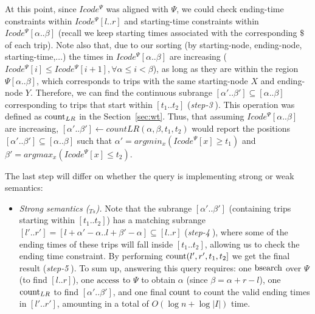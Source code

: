 \begin{itemize}
		At this point, since $Icode^{\Psi}$  was aligned with $\Psi$, 
		we could check ending-time constraints within $Icode^{\Psi}[l..r]$  and starting-time constraints 
		within $Icode^{\Psi}[\alpha..\beta]$ (recall we keep starting times associated with the corresponding $\$$ of each trip).
		Note also that, due to our sorting (by starting-node, ending-node, starting-time,$\dots$) the times in $Icode^{\Psi}[\alpha..\beta]$ are 
		increasing ($Icode^{\Psi}[i] \leq Icode^{\Psi}[i+1], \forall \alpha \leq i < \beta$), as long as they are within the region $\Psi[\alpha..\beta]$, which corresponds to trips with the same starting-node $X$ and ending-node $Y$.
		Therefore, we can find the continuous subrange $[\alpha'..\beta'] \subseteq [\alpha..\beta] $ corresponding to trips
		that start within $[t_1..t_2]$ ({\em step-\textcircled{3}}).
		This operation was defined as $\operatorname{count}_{LR}$ in the Section~\ref{sec:wt}.
		Thus, that assuming $Icode^{\Psi}[\alpha..\beta]$ are increasing,  
		$[\alpha'..\beta'] \leftarrow countLR(\alpha,\beta,t_1,t_2)$ would report the 
		positions $[\alpha'..\beta'] \subseteq [\alpha..\beta]$ such that $\alpha' = argmin_{x} (Icode^{\Psi}[x] \geq t_1)$ and
		$\beta' = argmax_{x} (Icode^{\Psi}[x] \leq t_2)$.
		
		
		The last step will differ on whether the query is implementing strong or weak semantics:
		
		\begin{itemize}
			\item {\em Strong semantics (\XtoY$_{Ts}$).} Note that the subrange $[\alpha'..\beta']$ (containing trips starting within $[t_1..t_2]$) 
			has a matching subrange $[l'..r'] = [l+\alpha'-\alpha..l+\beta'-\alpha] \subseteq [l..r]$ ({\em step-\textcircled{4}}), where some of the ending times of these trips will fall inside 
			$[t_1..t_2]$, allowing us to check the ending time constraint. By performing  $\operatorname{count}(l',r',t_1,t_2]$  we get the final result 
			({\em step-\textcircled{5}}). 
			To sum up, answering this query  requires: one $\operatorname{bsearch}$ over $\Psi$ (to find $[l..r]$), one $\operatorname{access}$ to $\Psi$ to obtain
			 $\alpha$ (since $\beta = \alpha+r-l$), one $\operatorname{count}_{LR}$ to find $[\alpha'..\beta']$, and one final $\operatorname{count}$ to count the valid ending times in $[l'..r']$, amounting in a total of $O(\log n + \log|I|)$ time.
			

\end{itemize}
\end{itemize}
